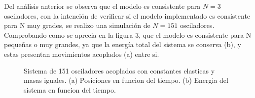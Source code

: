 \documentclass[11pt,letterpaper,twocolumn]{article}
\begin{document}
Del análisis anterior se observa que el modelo es consistente para $N=3$ osciladores, con la intención de verificar si el modelo implementado es consistente para N muy grades, se realizo una simulación de $N=151$ osciladores. Comprobando como se aprecia en la figura $3$, que el modelo es consistente para N pequeñas o muy grandes, ya que la energía total del sistema se conserva (b), y estas presentan movimientos acoplados (a) entre si. \\
\begin{figure}[h!]
\begin{center}
\caption{Sistema de 151 osciladores acoplados con constantes elasticas y masas iguales. (a) Posiciones en funcion del tiempo. (b) Energia del sistema en funcion del tiempo.}
\end{center}
\end{figure}
\end{document}
